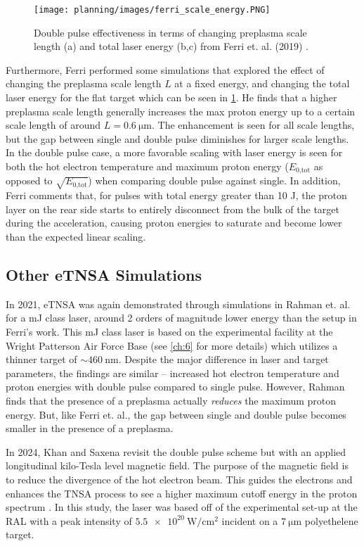 \begin{figure}
	\centering 
	\texttt{[image: planning/images/ferri\_scale\_energy.PNG]}
	\caption{Double pulse effectiveness in terms of changing preplasma scale length (a) and total laser energy (b,c) from Ferri et. al. (2019) \cite{Ferri_2019_Nat_Comm}.}
	\label{fig:ferri_scale_energy}
\end{figure}

Furthermore, Ferri performed some simulations that explored the effect of changing the preplasma scale length $L$ at a fixed energy, and changing the total laser energy for the flat target \cite{Ferri_2019_Nat_Comm} which can be seen in \cref{fig:ferri_scale_energy}. He finds that a higher preplasma scale length generally increases the max proton energy up to a certain scale length of around $L = \SI{0.6}{\micro \meter}$. The enhancement is seen for all scale lengths, but the gap between single and double pulse diminishes for larger scale lengths. In the double pulse case, a more favorable scaling with laser energy is seen for both the hot electron temperature and maximum proton energy ($E_\text{0,tot}$ as opposed to $\sqrt{E_\text{0,tot}}$) when comparing double pulse against single. In addition, Ferri comments that, for pulses with total energy greater than 10 J, the proton layer on the rear side starts to entirely disconnect from the bulk of the target during the acceleration, causing proton energies to saturate and become lower than the expected linear scaling.

\subsection{Other eTNSA Simulations}
In 2021, \gls{eTNSA} was again demonstrated through simulations in Rahman et. al. \cite{Rahman_2021_PoP} for a mJ class laser, around 2 orders of magnitude lower energy than the setup in Ferri's work. This mJ class laser is based on the experimental facility at the Wright Patterson Air Force Base (see \cref{ch:6} for more details) which utilizes a thinner target of $\sim \SI{460}{\nano \meter}$. Despite the major difference in laser and target parameters, the findings are similar -- increased hot electron temperature and proton energies with double pulse compared to single pulse. However, Rahman finds that the presence of a preplasma actually \emph{reduces} the maximum proton energy. But, like Ferri et. al., the gap between single and double pulse becomes smaller in the presence of a preplasma.

In 2024, Khan and Saxena \cite{Khan_2024_NJoP} revisit the double pulse scheme but with an applied longitudinal kilo-Tesla level magnetic field. The purpose of the magnetic field is to reduce the divergence of the hot electron beam. This guides the electrons and enhances the \gls{TNSA} process to see a higher maximum cutoff energy in the proton spectrum \cite{Arefiev_2016_NJoP}. In this study, the laser was based off of the experimental set-up at the \gls{RAL} with a peak intensity of $\SI{5.5e20}{\watt \per \centi \meter \squared}$ incident on a $\SI{7}{\micro \meter}$ polyethelene target. 

